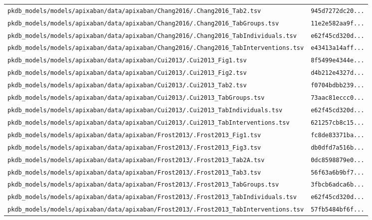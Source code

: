 \begin{longtable}{ll}
\texttt{pkdb\_models/models/apixaban/data/apixaban/Chang2016/.Chang2016\_Tab2.tsv} & \texttt{945d7272dc20...} \\
\texttt{pkdb\_models/models/apixaban/data/apixaban/Chang2016/.Chang2016\_TabGroups.tsv} & \texttt{11e2e582aa9f...} \\
\texttt{pkdb\_models/models/apixaban/data/apixaban/Chang2016/.Chang2016\_TabIndividuals.tsv} & \texttt{e62f45cd320d...} \\
\texttt{pkdb\_models/models/apixaban/data/apixaban/Chang2016/.Chang2016\_TabInterventions.tsv} & \texttt{e43413a14aff...} \\
\texttt{pkdb\_models/models/apixaban/data/apixaban/Cui2013/.Cui2013\_Fig1.tsv} & \texttt{8f5499e4344e...} \\
\texttt{pkdb\_models/models/apixaban/data/apixaban/Cui2013/.Cui2013\_Fig2.tsv} & \texttt{d4b212e4327d...} \\
\texttt{pkdb\_models/models/apixaban/data/apixaban/Cui2013/.Cui2013\_Tab2.tsv} & \texttt{f0704bdbb239...} \\
\texttt{pkdb\_models/models/apixaban/data/apixaban/Cui2013/.Cui2013\_TabGroups.tsv} & \texttt{73aac81eccc0...} \\
\texttt{pkdb\_models/models/apixaban/data/apixaban/Cui2013/.Cui2013\_TabIndividuals.tsv} & \texttt{e62f45cd320d...} \\
\texttt{pkdb\_models/models/apixaban/data/apixaban/Cui2013/.Cui2013\_TabInterventions.tsv} & \texttt{621257cb8c15...} \\
\texttt{pkdb\_models/models/apixaban/data/apixaban/Frost2013/.Frost2013\_Fig1.tsv} & \texttt{fc8de83371ba...} \\
\texttt{pkdb\_models/models/apixaban/data/apixaban/Frost2013/.Frost2013\_Fig3.tsv} & \texttt{db0dfd7a516b...} \\
\texttt{pkdb\_models/models/apixaban/data/apixaban/Frost2013/.Frost2013\_Tab2A.tsv} & \texttt{0dc8598879e0...} \\
\texttt{pkdb\_models/models/apixaban/data/apixaban/Frost2013/.Frost2013\_Tab3.tsv} & \texttt{56f63a6b9bf7...} \\
\texttt{pkdb\_models/models/apixaban/data/apixaban/Frost2013/.Frost2013\_TabGroups.tsv} & \texttt{3fbcb6adca6b...} \\
\texttt{pkdb\_models/models/apixaban/data/apixaban/Frost2013/.Frost2013\_TabIndividuals.tsv} & \texttt{e62f45cd320d...} \\
\texttt{pkdb\_models/models/apixaban/data/apixaban/Frost2013/.Frost2013\_TabInterventions.tsv} & \texttt{57fb5484bf6f...} \\

\end{longtable}
